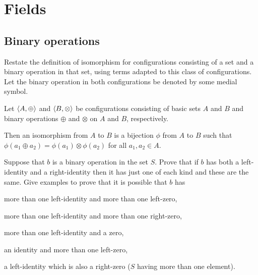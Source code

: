 \chapter{Fields}
\section{Binary operations}
\begin{exercise}
Restate the definition of isomorphism for configurations consisting of a set and a
binary operation in that set, using terms adapted to this class of configurations. Let the
binary operation in both configurations be denoted by some medial symbol.
\end{exercise}

\begin{solution}
Let $\left\langle A,\oplus\right\rangle$ and $\left\langle B,\otimes\right\rangle$ be configurations consisting of basic sets
$A$ and $B$ and binary operations $\oplus$ and $\otimes$ on $A$ and $B$, respectively.

Then an isomorphism from $A$ to $B$ is a bijection $\phi$ from $A$ to $B$ such that
$\phi(a_1\oplus a_2)=\phi(a_1)\otimes\phi(a_2)$ for all $a_1,a_2\in A$.
\end{solution}

\begin{exercise}
Suppose that $b$ is a binary operation in the set $S$. Prove that if $b$ has both a
left-identity and a right-identity then it has just one of each kind and these are the same.
Give examples to prove that it is possible that $b$ has
\begin{enumalpha}
    \item more than one left-identity and more than one left-zero,
    \item more than one left-identity and more than one right-zero,
    \item more than one left-identity and a zero,
    \item an identity and more than one left-zero,
    \item a left-identity which is also a right-zero ($S$ having more than one element).
\end{enumalpha}
\end{exercise}

